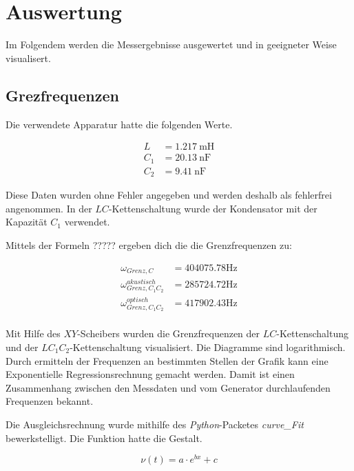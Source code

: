 



\section{Auswertung}

Im Folgendem werden die Messergebnisse ausgewertet und in geeigneter
Weise visualisert.

\subsection{Grezfrequenzen}

Die verwendete Apparatur hatte die folgenden Werte.

\begin{align}
  \label{L}
  L &= \SI{1,217}{\milli\henry}\\
  \label{C1}
  C_1 &= \SI{20,13}{\nano\farad}\\
  \label{C2}
  C_2 &= \SI{9,41}{\nano\farad}
\end{align}

Diese Daten wurden ohne Fehler angegeben und werden deshalb als fehlerfrei
angenommen. In der $LC$-Kettenschaltung wurde der Kondensator mit der
Kapazität $C_1$ verwendet.

Mittels der Formeln ????? ergeben dich die die Grenzfrequenzen zu:

\begin{align*}
  \omega_{Grenz,C} &= \num{404075,78}\si{\hertz}\\
  \omega_{Grenz,C_1C_2}^{akustisch} &= \num{285724,72}\si{\hertz}\\
  \omega_{Grenz,C_1C_2}^{optisch} &= \num{417902,43}\si{\hertz}\\
\end{align*}

Mit Hilfe des $XY$-Scheibers wurden die Grenzfrequenzen der $LC$-Kettenschaltung
und der $LC_1C_2$-Kettenschaltung visualisiert. Die Diagramme sind
logarithmisch. Durch ermitteln der Frequenzen an bestimmten Stellen der
Grafik kann eine Exponentielle Regressionsrechnung gemacht werden.
Damit ist einen Zusammenhang zwischen den Messdaten und vom Generator durchlaufenden
Frequenzen bekannt.

Die Ausgleichsrechnung wurde mithilfe des \emph{Python}-Packetes
\emph{curve\_Fit} bewerkstelligt. Die Funktion hatte die Gestalt.

\begin{equation}
  \nu(t) = a\cdot e^{bx}+c
\end{equation}

